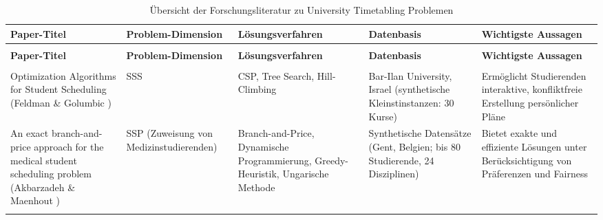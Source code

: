 \scriptsize
\begin{xltabular}{\textwidth}{@{}
  >{\RaggedRight\arraybackslash}p{2.2cm}
  >{\RaggedRight\arraybackslash}p{1.2cm}
  >{\RaggedRight\arraybackslash}p{3cm}
  >{\RaggedRight\arraybackslash}p{3cm}
  >{\RaggedRight\arraybackslash}X
  @{}}
  \toprule
  \textbf{Paper-Titel} & \textbf{Problem-Dimension} & \textbf{Lösungsverfahren} & \textbf{Datenbasis} & \textbf{Wichtigste Aussagen} \\ \midrule
  \endfirsthead

   \\ \addlinespace
  \toprule
  \textbf{Paper-Titel} & \textbf{Problem-Dimension} & \textbf{Lösungsverfahren} & \textbf{Datenbasis} & \textbf{Wichtigste Aussagen} \\ \midrule
  \endhead

  \midrule
   \\
  \endfoot

  \bottomrule
  \caption{Übersicht der Forschungsliteratur zu University Timetabling Problemen}
  \endlastfoot

  Optimization Algorithms for Student Scheduling (Feldman \& Golumbic \cite{feldmangolumbic})                                   &
  SSS                                                                                                        &
  CSP, Tree Search, Hill-Climbing                                                                            &
  Bar-Ilan University, Israel (synthetische Kleinstinstanzen: 30 Kurse)                   &
  Ermöglicht Studierenden interaktive, konfliktfreie Erstellung persönlicher Pläne                                                                                                                                        \\ \addlinespace

  An exact branch-and-price approach for the medical student scheduling problem (Akbarzadeh \& Maenhout \cite{v-akbarzadeh2021exact})  &
  SSP (Zuweisung von Medizinstudierenden)                                                                    &
  Branch-and-Price, Dynamische Programmierung, Greedy-Heuristik, Ungarische Methode                          &
  Synthetische Datensätze (Gent, Belgien; bis 80 Studierende, 24 Disziplinen)                                      &
  Bietet exakte und effiziente Lösungen unter Berücksichtigung von Präferenzen und Fairness \\ \addlinespace


\end{xltabular}
